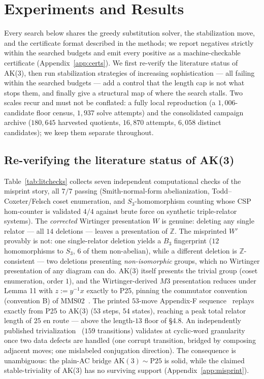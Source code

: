 \section{Experiments and Results}\label{sec:results}

Every search below shares the greedy substitution solver, the stabilization move, and the
certificate format described in the methods; we report negatives strictly within the
searched budgets and emit every positive as a machine-checkable certificate
(Appendix~\ref{app:certs}). We first re-verify the literature status of AK(3), then run
stabilization strategies of increasing sophistication --- all failing within the searched
budgets --- add a control that the length cap is not what stops them, and finally give a
structural map of where the search stalls. Two scales recur and must not be conflated: a
fully local reproduction (a $1{,}006$-candidate floor census, $1{,}937$ solve attempts) and
the consolidated campaign archive ($180{,}645$ harvested quotients, $16{,}870$ attempts,
$6{,}058$ distinct candidates); we keep them separate throughout.

\subsection{Re-verifying the literature status of AK(3)}

Table~\ref{tab:litchecks} collects seven independent computational checks of the misprint
story, all $7/7$ passing (Smith-normal-form abelianization, Todd--Coxeter/Felsch coset
enumeration, and $S_3$-homomorphism counting whose CSP hom-counter is validated $4/4$
against brute force on synthetic triple-relator systems). The \emph{corrected} Wirtinger
presentation $W$ is genuine: deleting any single relator --- all $14$ deletions --- leaves a
presentation of $\mathbb{Z}$. The misprinted $W'$ provably is not: one single-relator
deletion yields a $B_3$ fingerprint ($12$ homomorphisms to $S_3$, $6$ of them non-abelian),
while a different deletion is $\mathbb{Z}$-consistent --- two deletions presenting
\emph{non-isomorphic} groups, which no Wirtinger presentation of any diagram can do. AK(3)
itself presents the trivial group (coset enumeration, order $1$), and the Wirtinger-derived
$M3$ presentation reduces under Lemma 11 with $z:=y^{-1}x$ exactly to P25, pinning the
commutator convention (convention B) of MMS02~\cite{myasnikov2002ac}. The printed $53$-move
Appendix-F sequence~\cite{shehper2024hard} replays exactly from P25 to AK(3) ($53$ steps,
$54$ states), reaching a peak total relator length of $25$ en route --- above the
length-$13$ floor of \S4.8. An independently published
trivialization~\cite{lisitsa_zenodo, lisitsa2025ak3} ($159$ transitions) validates at
cyclic-word granularity once two data defects are handled (one corrupt transition, bridged
by composing adjacent moves; one mislabeled conjugation direction). The consequence is
unambiguous: the plain-AC bridge $\mathrm{AK}(3)\sim\mathrm{P}25$ is solid, while the
claimed stable-triviality of AK(3) has no surviving support (Appendix~\ref{app:misprint}).

